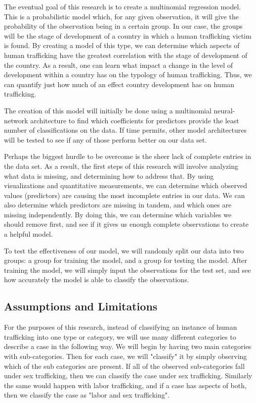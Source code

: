 \documentclass{article} %
\begin{document}
The eventual goal of this research is to create a multinomial regression model. This is a probabilistic model which, for any given observation, it will give the probability of the observation being in a certain group. In our case, the groups will be the stage of development of a country in which a human trafficking victim is found. By creating a model of this type, we can determine which aspects of human trafficking have the greatest correlation with the stage of development of the country. As a result, one can learn what impact a change in the level of development within a country has on the typology of human trafficking. Thus, we can quantify just how much of an effect country development has on human trafficking.

The creation of this model will initially be done using a multinomial neural-network architecture to find which coefficients for predictors provide the least number of classifications on the data. If time permits, other model architectures will be tested to see if any of those perform better on our data set.


Perhaps the biggest hurdle to be overcome is the sheer lack of complete entries in the data set. As a result, the first steps of this research will involve analyzing what data is missing, and determining how to address that. By using visualizations and quantitative measurements, we can determine which observed values (predictors) are causing the most incomplete entries in our data. We can also determine which predictors are missing in tandem, and which ones are missing independently. By doing this, we can determine which variables we should remove first, and see if it gives us enough complete observations to create a helpful model.

To test the effectiveness of our model, we will randomly split our data into two groups: a group for training the model, and a group for testing the model. After training the model, we will simply input the observations for the test set, and see how accurately the model is able to classify the observations.

\subsection{Assumptions and Limitations}


For the purposes of this research, instead of classifying an instance of human trafficking into one type or category, we will use many different categories to describe a case in the following way. We will begin by having two main categories with sub-categories. Then for each case, we will "classify" it by simply observing which of the sub categories are present. If all of the observed sub-categories fall under sex trafficking, then we can classify the case under sex trafficking. Similarly the same would happen with labor trafficking, and if a case has aspects of both, then we classify the case as "labor and sex trafficking".
\end{document}
